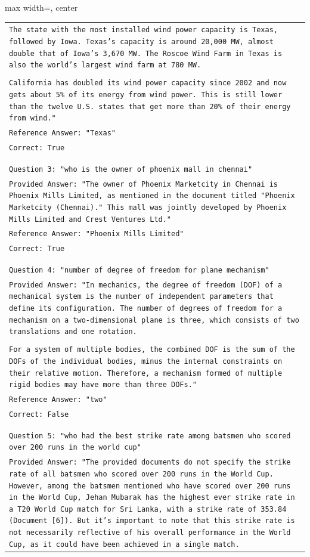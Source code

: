 \documentclass[11pt]{article}
\begin{document}
\begin{table}[ht]
\begin{adjustbox}{max width=\textwidth, center}
\begin{tabular}{>{\raggedright\arraybackslash\tt}p{}<{}}
\\
The state with the most installed wind power capacity is Texas, followed by Iowa. Texas's capacity is around 20,000 MW, almost double that of Iowa's 3,670 MW. The Roscoe Wind Farm in Texas is also the world's largest wind farm at 780 MW. \\
\\
California has doubled its wind power capacity since 2002 and now gets about 5\% of its energy from wind power. This is still lower than the twelve U.S. states that get more than 20\% of their energy from wind."\\
Reference Answer: "Texas"\\
Correct: True\\
\\
\\
Question 3: "who is the owner of phoenix mall in chennai"\\
Provided Answer: "The owner of Phoenix Marketcity in Chennai is Phoenix Mills Limited, as mentioned in the document titled "Phoenix Marketcity (Chennai)." This mall was jointly developed by Phoenix Mills Limited and Crest Ventures Ltd."\\
Reference Answer: "Phoenix Mills Limited"\\
Correct: True\\
\\
\\
Question 4: "number of degree of freedom for plane mechanism"\\
Provided Answer: "In mechanics, the degree of freedom (DOF) of a mechanical system is the number of independent parameters that define its configuration. The number of degrees of freedom for a mechanism on a two-dimensional plane is three, which consists of two translations and one rotation. \\
\\
For a system of multiple bodies, the combined DOF is the sum of the DOFs of the individual bodies, minus the internal constraints on their relative motion. Therefore, a mechanism formed of multiple rigid bodies may have more than three DOFs."\\
Reference Answer: "two"\\
Correct: False\\
\\
\\
Question 5: "who had the best strike rate among batsmen who scored over 200 runs in the world cup"\\
Provided Answer: "The provided documents do not specify the strike rate of all batsmen who scored over 200 runs in the World Cup. However, among the batsmen mentioned who have scored over 200 runs in the World Cup, Jehan Mubarak has the highest ever strike rate in a T20 World Cup match for Sri Lanka, with a strike rate of 353.84 (Document [6]). But it's important to note that this strike rate is not necessarily reflective of his overall performance in the World Cup, as it could have been achieved in a single match.


\end{tabular}
\end{adjustbox}
\end{table}
\end{document}
